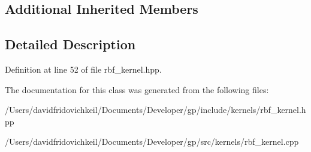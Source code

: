 \subsection*{Additional Inherited Members}


\subsection{Detailed Description}


Definition at line 52 of file rbf\+\_\+kernel.\+hpp.



The documentation for this class was generated from the following files\+:\begin{DoxyCompactItemize}
\item 
/\+Users/davidfridovichkeil/\+Documents/\+Developer/gp/include/kernels/rbf\+\_\+kernel.\+hpp\item 
/\+Users/davidfridovichkeil/\+Documents/\+Developer/gp/src/kernels/rbf\+\_\+kernel.\+cpp\end{DoxyCompactItemize}
